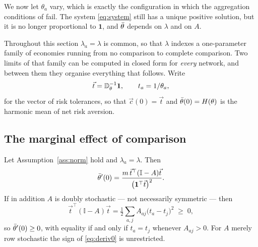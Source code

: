 We now let $\theta_a$ vary, which is exactly the configuration in which the
aggregation conditions of \cite{gomez} fail. The system \eqref{eq:system} still
has a unique positive solution, but it is no longer proportional to
$\mathbf 1$, and $\bar\theta$ depends on $\lambda$ and on $A$.

Throughout this section $\lambda_a=\lambda$ is common, so that
$\lambda$ indexes a one-parameter family of economies running from no
comparison to complete comparison. Two limits of that family can be computed in
closed form for \emph{every} network, and between them they organise everything
that follows. Write
%
\begin{equation}
\vec t=\mathbb{D}_{\theta}^{-1}\mathbf 1,
\qquad t_a=1/\theta_a ,
\label{eq:tol}
\end{equation}
%
for the vector of risk tolerances, so that $\vec c(0)=\vec t$ and
$\bar\theta(0)=H(\theta)$ is the harmonic mean of net risk aversion.

\subsection{The marginal effect of comparison}
\label{sec:marginal}

\begin{theorem}
\label{thm:deriv}
Let Assumption~\ref{ass:norm} hold and $\lambda_a=\lambda$. Then
%
\begin{equation}
\bar\theta'(0)=\frac{m\,\vec t^{\top}(\mathbb{I}-A)\vec t}
{\big(\mathbf 1^{\top}\vec t\big)^{2}} .
\label{eq:deriv0}
\end{equation}
%
If in addition $A$ is doubly stochastic --- not necessarily symmetric --- then
%
\begin{equation}
\vec t^{\top}(\mathbb{I}-A)\vec t
=\tfrac12\sum_{a,j}A_{aj}\big(t_a-t_j\big)^{2}\;\geq\;0 ,
\label{eq:dirichlet}
\end{equation}
%
so $\bar\theta'(0)\geq0$, with equality if and only if $t_a=t_j$ whenever $A_{aj}>0$.
For $A$ merely row stochastic the sign of \eqref{eq:deriv0} is unrestricted.
\end{theorem}

